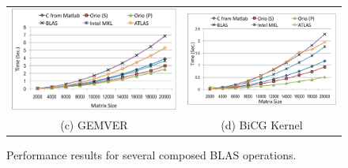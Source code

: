 \documentclass[runningheads]{llncs}
\begin{document}
\begin{figure}[htp]
{\begin{tabular}{cc}
\begin{minipage}[b]{.5\textwidth}
\includegraphics[width=\textwidth]{figures/gemver.pdf}
\end{minipage}
&
\begin{minipage}[b]{.5\textwidth}
\includegraphics[width=\textwidth]{figures/bicgkernel.pdf}
\end{minipage}\\

(c) GEMVER & (d) BiCG Kernel \\

\end{tabular}
}
\vspace{-.1in}
\caption{Performance results for several composed BLAS operations.}
\label{fig:results}
\vspace{-.1in}
\end{figure}
\end{document}
